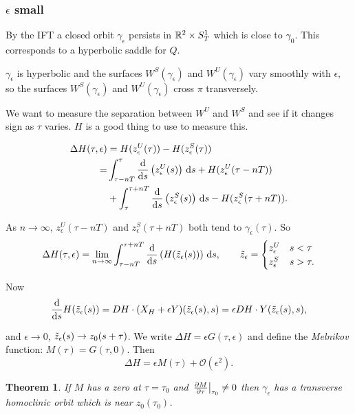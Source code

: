 \documentclass{notes}
\newcommand{\cO}{\mathcal{O}}
\theoremstyle{plain}
\newtheorem{theorem}[proposition]{Theorem}
\begin{document}
\subsubsection*{$\epsilon$ small}

By the IFT a closed orbit $\gamma_\epsilon$ persists in $\mathbb{R}^2 \times
S^1_T$ which is close to $\gamma_0$.  This corresponds to a hyperbolic
saddle for $Q$.

$\gamma_\epsilon$ is hyperbolic and the surfaces
$W^S(\gamma_\epsilon)$ and $W^U(\gamma_\epsilon)$ vary smoothly with
$\epsilon$, so the surfaces $W^S(\gamma_\epsilon)$ and
$W^U(\gamma_\epsilon)$ cross $\pi$ transversely.

\vspace{2in}

We want to measure the separation between $W^U$ and $W^S$ and
see if it changes sign as $\tau$ varies.  $H$ is a good thing to use
to measure this.

\begin{align*}
\Delta H(\tau,\epsilon) &= H(z^U_\epsilon(\tau)) -
H(z^S_\epsilon(\tau)) \\
=& \int_{\tau - n T}^\tau \frac{\mathrm{d}}{\mathrm{d} s} \left(z^U_\epsilon(s)\right)\, \mathrm{d} s
+ H( z^U_\epsilon(\tau - n T)) \\
&+ \int^{\tau + n T}_\tau \frac{\mathrm{d}}{\mathrm{d} s} \left(z^S_\epsilon(s)\right)\, \mathrm{d} s
- H( z^S_\epsilon(\tau + n T)).
\end{align*}

As $n \to \infty$, $z^U_\epsilon(\tau - nT)$ and $z^S_\epsilon(\tau +
n T)$ both tend to $\gamma_\epsilon(\tau)$.  So
\[
\Delta H(\tau,\epsilon) = \lim_{n \to \infty}
\int_{\tau - n T}^{\tau + n T} \frac{\mathrm{d}}{\mathrm{d} s} \left( H
  ( \Tilde{z}_\epsilon(s)) \right)\, \mathrm{d} s, \qquad
\Tilde{z}_\epsilon = \begin{cases}
z^U_\epsilon & s < \tau \\
z^S_\epsilon & s > \tau.
\end{cases}
\]

Now
\[
\frac{\mathrm{d}}{\mathrm{d} s} H(\Tilde{z}_\epsilon(s)) = DH\cdot (X_H + \epsilon Y)
(\Tilde{z}_\epsilon(s),s) = \epsilon DH \cdot Y (\Tilde{z}_\epsilon(s),s),
\]

and $\epsilon \to 0$, $\Tilde{z}_\epsilon(s) \to z_0(s+\tau)$.  We
write $\Delta H = \epsilon G(\tau,\epsilon)$ and define the
\emph{Melnikov} function: $M(\tau) = G(\tau,0)$.  Then
\[
\Delta H = \epsilon M(\tau) + \cO(\epsilon^2).
\]

\begin{theorem}
  If $M$ has a zero at $\tau = \tau_0$ and
  $\left. \frac{\partial M}{\partial \tau} \right|_{\tau_0} \neq 0$ then $\gamma_\epsilon$ has
    a transverse homoclinic orbit which is near $z_0(\tau_0)$.
\end{theorem}
\end{document}

